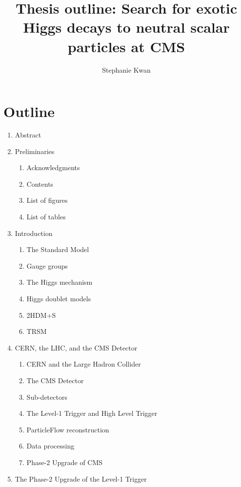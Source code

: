 \documentclass{article}
\title{Thesis outline: Search for exotic Higgs decays to neutral scalar particles at CMS}
\author{Stephanie Kwan}
\begin{document}
\maketitle

\section{Outline}

\begin{enumerate}
    \item Abstract
    \item Preliminaries
        \begin{enumerate}
            \item Acknowledgments
            \item Contents
            \item List of figures
            \item List of tables
        \end{enumerate}
    \item Introduction
        \begin{enumerate}
            \item The Standard Model
            \item Gauge groups
            \item The Higgs mechanism
            \item Higgs doublet models
            \item 2HDM+S 
            \item TRSM
        \end{enumerate}
    \item CERN, the LHC, and the CMS Detector
        \begin{enumerate}
            \item CERN and the Large Hadron Collider
            \item The CMS Detector
            \item Sub-detectors
            \item The Level-1 Trigger and High Level Trigger
            \item ParticleFlow reconstruction
            \item Data processing 
            \item Phase-2 Upgrade of CMS
        \end{enumerate}
    \item The Phase-2 Upgrade of the Level-1 Trigger
        \begin{enumerate}

\end{enumerate}
\end{enumerate}
\end{document}
